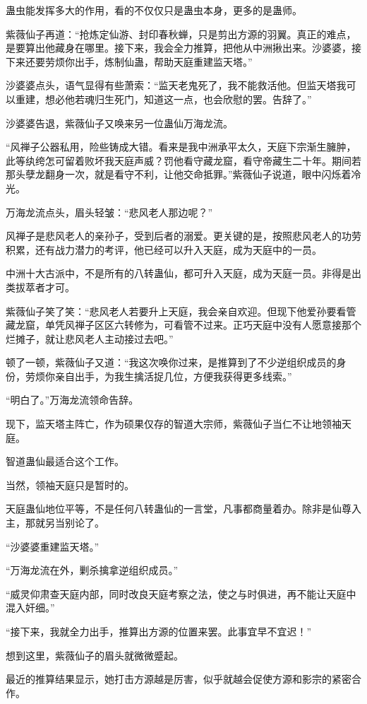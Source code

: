 \begin{this_body}
蛊虫能发挥多大的作用，看的不仅仅只是蛊虫本身，更多的是蛊师。

紫薇仙子再道：“抢炼定仙游、封印春秋蝉，只是剪出方源的羽翼。真正的难点，是要算出他藏身在哪里。接下来，我会全力推算，把他从中洲揪出来。沙婆婆，接下来还要劳烦你出手，炼制仙蛊，帮助天庭重建监天塔。”

沙婆婆点头，语气显得有些萧索：“监天老鬼死了，我不能救活他。但监天塔我可以重建，想必他若魂归生死门，知道这一点，也会欣慰的罢。告辞了。”

沙婆婆告退，紫薇仙子又唤来另一位蛊仙万海龙流。

“风禅子公器私用，险些铸成大错。看来是我中洲承平太久，天庭下宗渐生臃肿，此等纨绔怎可留着败坏我天庭声威？罚他看守藏龙窟，看守帝藏生二十年。期间若那头孽龙翻身一次，就是看守不利，让他交命抵罪。”紫薇仙子说道，眼中闪烁着冷光。

万海龙流点头，眉头轻皱：“悲风老人那边呢？”

风禅子是悲风老人的亲孙子，受到后者的溺爱。更关键的是，按照悲风老人的功劳积累，还有战力潜力的考评，他已经可以升入天庭，成为天庭中的一员。

中洲十大古派中，不是所有的八转蛊仙，都可升入天庭，成为天庭一员。非得是出类拔萃者才可。

紫薇仙子笑了笑：“悲风老人若要升上天庭，我会亲自欢迎。但现下他爱孙要看管藏龙窟，单凭风禅子区区六转修为，可看管不过来。正巧天庭中没有人愿意接那个烂摊子，就让悲风老人主动接过去吧。”

顿了一顿，紫薇仙子又道：“我这次唤你过来，是推算到了不少逆组织成员的身份，劳烦你亲自出手，为我生擒活捉几位，方便我获得更多线索。”

“明白了。”万海龙流领命告辞。

现下，监天塔主阵亡，作为硕果仅存的智道大宗师，紫薇仙子当仁不让地领袖天庭。

智道蛊仙最适合这个工作。

当然，领袖天庭只是暂时的。

天庭蛊仙地位平等，不是任何八转蛊仙的一言堂，凡事都商量着办。除非是仙尊入主，那就另当别论了。

“沙婆婆重建监天塔。”

“万海龙流在外，剿杀擒拿逆组织成员。”

“威灵仰肃查天庭内部，同时改良天庭考察之法，使之与时俱进，再不能让天庭中混入奸细。”

“接下来，我就全力出手，推算出方源的位置来罢。此事宜早不宜迟！”

想到这里，紫薇仙子的眉头就微微蹙起。

最近的推算结果显示，她打击方源越是厉害，似乎就越会促使方源和影宗的紧密合作。


\end{this_body}

